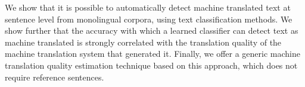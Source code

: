 We show that it is possible to automatically detect machine translated text at sentence level from monolingual corpora, using text classification methods. We show further that the accuracy with which a learned classifier can detect text as machine translated is strongly correlated with the translation quality of the machine translation system that generated it. Finally, we offer a generic machine translation quality estimation technique based on this approach, which does not require reference sentences.
